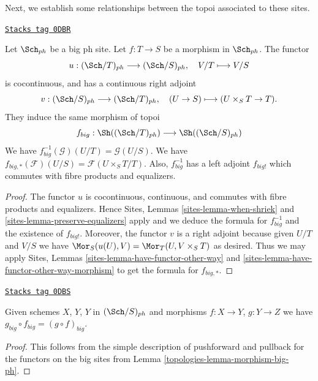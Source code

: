 Next, we establish some relationships between the topoi
associated to these sites.

\begin{lemma}
\label{topologies-lemma-morphism-big-ph}
\href{https://stacks.math.columbia.edu/tag/0DBR}{\texttt{Stacks tag 0DBR}}

Let $\Sch_{ph}$ be a big ph site.
Let $f : T \to S$ be a morphism in $\Sch_{ph}$.
The functor
$$
u : (\Sch/T)_{ph} \longrightarrow (\Sch/S)_{ph},
\quad
V/T \longmapsto V/S
$$
is cocontinuous, and has a continuous right adjoint
$$
v : (\Sch/S)_{ph} \longrightarrow (\Sch/T)_{ph},
\quad
(U \to S) \longmapsto (U \times_S T \to T).
$$
They induce the same morphism of topoi
$$
f_{big} :
\Sh((\Sch/T)_{ph})
\longrightarrow
\Sh((\Sch/S)_{ph})
$$
We have $f_{big}^{-1}(\mathcal{G})(U/T) = \mathcal{G}(U/S)$.
We have $f_{big, *}(\mathcal{F})(U/S) = \mathcal{F}(U \times_S T/T)$.
Also, $f_{big}^{-1}$ has a left adjoint $f_{big!}$ which commutes with
fibre products and equalizers.
\end{lemma}

\begin{proof}
The functor $u$ is cocontinuous, continuous, and commutes with fibre products
and equalizers. Hence
Sites, Lemmas \ref{sites-lemma-when-shriek} and
\ref{sites-lemma-preserve-equalizers}
apply and we deduce the formula
for $f_{big}^{-1}$ and the existence of $f_{big!}$. Moreover,
the functor $v$ is a right adjoint because given $U/T$ and $V/S$
we have $\Mor_S(u(U), V) = \Mor_T(U, V \times_S T)$
as desired. Thus we may apply
Sites, Lemmas \ref{sites-lemma-have-functor-other-way} and
\ref{sites-lemma-have-functor-other-way-morphism} to get the
formula for $f_{big, *}$.
\end{proof}

\begin{lemma}[Composition ph]
\label{topologies-lemma-composition-ph}
\href{https://stacks.math.columbia.edu/tag/0DBS}{\texttt{Stacks tag 0DBS}}

Given schemes $X$, $Y$, $Y$ in $(\Sch/S)_{ph}$
and morphisms $f : X \to Y$, $g : Y \to Z$ we have
$g_{big} \circ f_{big} = (g \circ f)_{big}$.
\end{lemma}

\begin{proof}

This follows from the simple description of pushforward
and pullback for the functors on the big sites from
Lemma \ref{topologies-lemma-morphism-big-ph}.
\end{proof}

